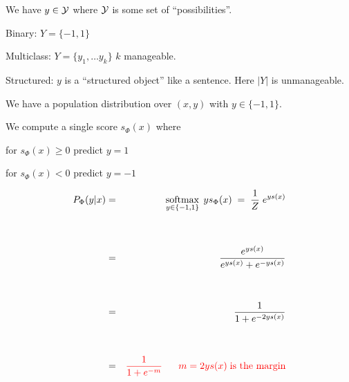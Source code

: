 {

We have {\color{red} $y \in {\cal Y}$} where {\color{red} ${\cal Y}$} is some set of ``possibilities''.

\vfill
Binary: {\color{red} $Y = \{-1,1\}$}

\vfill
Multiclass: {\color{red} $Y = \{y_1,\ldots y_k\}$} $k$ manageable.

\vfill
Structured: {\color{red} $y$} is a ``structured object'' like a sentence.  Here {\color{red} $|Y|$} is unmanageable.


We have a population distribution over $(x,y)$ with $y \in \{-1,1\}$.

\vfill
We compute a single score $s_\Phi(x)$ where

\vfill
for $s_\Phi(x) \geq 0$ predict $y = 1$

\vfill
for $s_\Phi(x) < 0$ predict $y = -1$


\begin{eqnarray*}
  P_\Phi(y|x) & = & \operatorname*{softmax}_{y \in \{-1,1\}}\;ys_\Phi(x) \;=\; \frac{1}{Z} \;e^{ys(x)} \\
  \\
  \\
  & = & \frac{e^{ys(x)}}{e^{ys(x)} + e^{-ys(x)}} \\
  \\
  \\
  & = & \frac{1}{1 + e^{-2ys(x)}} \\
  \\
  \\
    & = & {\color{red} \frac{1}{1 + e^{-m}} \;\;\;\;\;\;m = 2ys(x)\;\mbox{is the margin}}
\end{eqnarray*}


}
